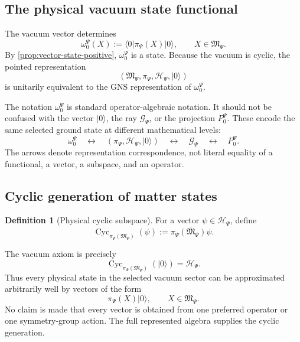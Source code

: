 \documentclass[11pt,reqno]{scrartcl}
\newcommand{\scrHP}{\mathscr H_{\Psi}}
\newcommand{\algP}{\mathfrak M_{\Psi}}
\newcommand{\piP}{\pi_{\Psi}}
\newcommand{\omegaP}{\omega_{0}^{\Psi}}
\newcommand{\PzeroP}{P_{0}^{\Psi}}
\newcommand{\ket}[1]{\lvert #1\rangle}
\newcommand{\bra}[1]{\langle #1\rvert}
\DeclareMathOperator{\Cyc}{Cyc}
\theoremstyle{plain}
\theoremstyle{definition}
\newtheorem{definition}[definition]{Definition}
\theoremstyle{remark}
\begin{document}
\subsection{The physical vacuum state functional}

The vacuum vector determines
\begin{equation}
  \boxed{
  \omegaP(X)
  :=\bra0\piP(X)\ket0,
  \qquad X\in\algP.}
  \label{eq:physical-vacuum-functional}
\end{equation}
By \cref{prop:vector-state-positive}, $\omegaP$ is a state.  Because the
vacuum is cyclic, the pointed representation
\begin{equation}
  (\algP,\piP,\scrHP,\ket0)
  \label{eq:physical-pointed-representation}
\end{equation}
is unitarily equivalent to the GNS representation of $\omegaP$.

The notation $\omegaP$ is standard operator-algebraic notation.  It should
not be confused with the vector $\ket0$, the ray $\mathscr G_{\Psi}$, or the
projection $\PzeroP$.  These encode the same selected ground state at
different mathematical levels:
\begin{equation}
  \boxed{
  \omegaP
  \quad\longleftrightarrow\quad
  (\piP,\scrHP,\ket0)
  \quad\longleftrightarrow\quad
  \mathscr G_{\Psi}
  \quad\longleftrightarrow\quad
  \PzeroP.}
  \label{eq:physical-ground-levels}
\end{equation}
The arrows denote representation correspondence, not literal equality of a
functional, a vector, a subspace, and an operator.

\subsection{Cyclic generation of matter states}

\begin{definition}[Physical cyclic subspace]
\label{def:physical-cyclic-subspace}
For a vector $\psi\in\scrHP$, define
\begin{equation}
  \Cyc_{\piP(\algP)}(\psi)
  :=\overline{\piP(\algP)\psi}.
\end{equation}
\end{definition}

The vacuum axiom is precisely
\begin{equation}
  \Cyc_{\piP(\algP)}(\ket0)=\scrHP.
\end{equation}
Thus every physical state in the selected vacuum sector can be approximated
arbitrarily well by vectors of the form
\begin{equation}
  \piP(X)\ket0,
  \qquad X\in\algP.
\end{equation}
No claim is made that every vector is obtained from one preferred operator or
one symmetry-group action.  The full represented algebra supplies the cyclic
generation.
\end{document}
